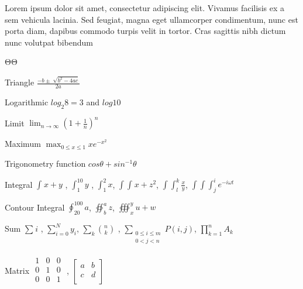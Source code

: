 \documentclass{book}
\begin{document}
Lorem ipsum dolor sit amet, consectetur adipiscing elit. Vivamus facilisis ex a sem vehicula lacinia. Sed feugiat, magna eget ullamcorper condimentum, nunc est porta diam, dapibus commodo turpis velit in tortor. Cras sagittis nibh dictum nunc volutpat bibendum 

ΘΘ

Triangle $\frac{-b\pm \sqrt[]{{b}^{2}-4ac}}{2a}$

Logarithmic ${log}_{2}8=3$ and $log10$

Limit $\lim_{n\rightarrow \infty }{(1+\frac{1}{n})}^{n}$

Maximum $\max_{0\leq x\leq 1}x{e}^{-{x}^{2}}$

Trigonometry function $cos\theta + {sin}^{-1}\theta $

Integral $\int_{}^{} x+y$ , $\int_{1}^{10} y$ , $\int_{1}^{2} x$, $\int\!\int _{}^{} x+{z}^{2}$, $\int\!\int _{l}^{k} \frac{x}{y}$, $\int\!\int\!\int _{j}^{i} {e}^{-i\omega t}$

Contour Integral $\oint _{20}^{100} a$, $\oiint _{b}^{a} z$, $\oiiint _{x}^{y} u+w$

Sum $\sum _{}^{} i$ , $\sum _{i=0}^{N} {y}_{i}$, $\sum _{k}^{} {n \choose k}$ , $\sum _{\begin{array}{lr}
0\leq  i \leq  m \\
0<j<n  \\
\end{array}}^{} P(i,j)$, $\prod _{k=1}^{n} {A}_{k}$

Matrix $\begin{matrix}
 1 & 0 & 0 \\
0 & 1 & 0 \\
0 & 0 & 1 \\
 \end{matrix}
$ , $\begin{bmatrix}
 a & b \\
c & d \\
 \end{bmatrix}
$
\end{document}
